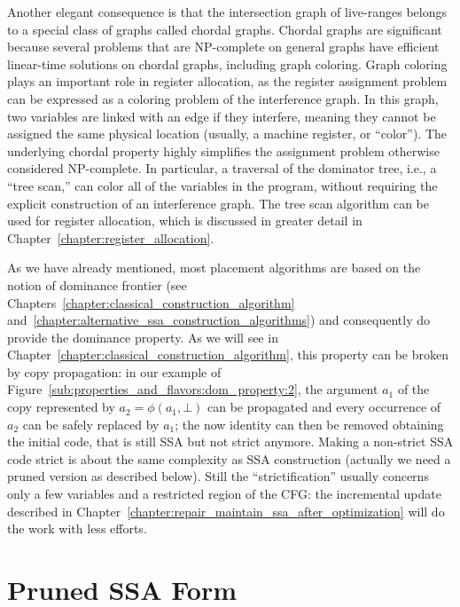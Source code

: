 Another elegant consequence is that the intersection graph of live-ranges belongs to a special class of graphs called chordal graphs. 
Chordal graphs are significant because several problems that are NP-complete on general graphs have efficient linear-time solutions on chordal graphs, including graph coloring. 
Graph coloring plays an important role in register allocation, as the register assignment problem can be expressed as a coloring problem of the interference graph. 
In this graph, two variables are linked with an edge if they interfere, meaning they cannot be assigned the same physical location (usually, a machine register, or ``color''). 
The underlying chordal property highly simplifies the assignment problem otherwise considered NP-complete. 
In particular, a traversal of the dominator tree, i.e., a ``tree scan,'' can color all of the variables in the program, without requiring the explicit construction of an interference graph. 
The tree scan algorithm can be used for register allocation, which is discussed in greater detail in Chapter~\ref{chapter:register_allocation}.

As we have already mentioned, most \phifun placement algorithms are based on the notion of dominance frontier (see Chapters~\ref{chapter:classical_construction_algorithm} and~\ref{chapter:alternative_ssa_construction_algorithms}) and consequently do provide the dominance property. 
As we will see in Chapter~\ref{chapter:classical_construction_algorithm}, this property can be broken by copy propagation:  in our example of Figure~\ref{sub:properties_and_flavors:dom_property:2}, the argument $a_1$ of the copy represented by $a_2=\phi(a_1,\bot)$ can be propagated and every occurrence of $a_2$ can be safely replaced by $a_1$; 
the now identity \phifun can then be removed obtaining the initial code, that is still SSA but not strict anymore. 
Making a non-strict SSA code strict is about the same complexity as SSA construction (actually we need a pruned version as described below). 
Still the ``strictification'' usually concerns only a few variables and a restricted region of the CFG:  the incremental update described in Chapter~\ref{chapter:repair_maintain_ssa_after_optimization} will do the work with less efforts.

\section{Pruned SSA Form}
\label{sec-prop-pruned}

